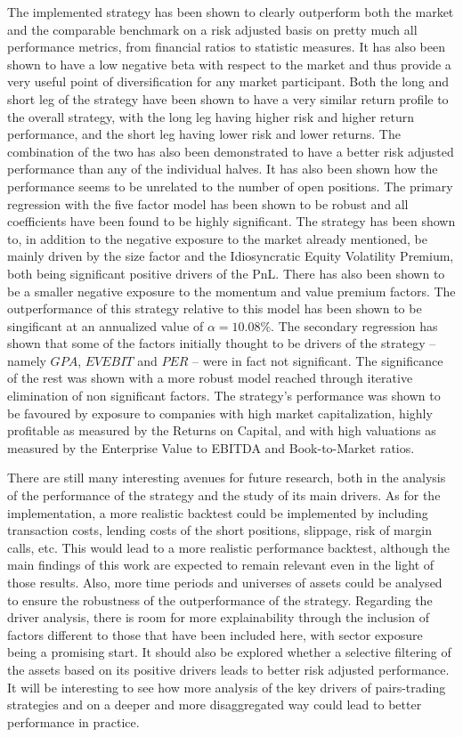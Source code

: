 The implemented strategy has been shown to clearly outperform both the market and the comparable benchmark on a risk adjusted basis on pretty much all performance metrics, from financial ratios to statistic measures. It has also been shown to have a low negative beta with respect to the market and thus provide a very useful point of diversification for any market participant. Both the long and short leg of the strategy have been shown to have a very similar return profile to the overall strategy, with the long leg having higher risk and higher return performance, and the short leg having lower risk and lower returns. The combination of the two has also been demonstrated to have a better risk adjusted performance than any of the individual halves. It has also been shown how the performance seems to be unrelated to the number of open positions. 
The primary regression with the five factor model has been shown to be robust and all coefficients have been found to be highly significant. The strategy has been shown to, in addition to the negative exposure to the market already mentioned, be mainly driven by the size factor and the Idiosyncratic Equity Volatility Premium, both being significant positive drivers of the PnL. There has also been shown to be a smaller negative exposure to the momentum and value premium factors. The outperformance of this strategy relative to this model has been shown to be singificant at an annualized value of $\alpha=10.08\%$. 
The secondary regression has shown that some of the factors initially thought to be drivers of the strategy -- namely $GPA$, $EVEBIT$ and $PER$ -- were in fact not significant. The significance of the rest was shown with a more robust model reached through iterative elimination of non significant factors. The strategy's performance was shown to be favoured by exposure to companies with high market capitalization, highly profitable as measured by the Returns on Capital, and with high valuations as measured by the Enterprise Value to EBITDA and Book-to-Market ratios. 

There are still many interesting avenues for future research, both in the analysis of the performance of the strategy and the study of its main drivers. 
As for the implementation, a more realistic backtest could be implemented by including transaction costs, lending costs of the short positions, slippage, risk of margin calls, etc. This would lead to a more realistic performance backtest, although the main findings of this work are expected to remain relevant even in the light of those results. Also, more time periods and universes of assets could be analysed to ensure the robustness of the outperformance of the strategy.
Regarding the driver analysis, there is room for more explainability through the inclusion of factors different to those that have been included here, with sector exposure being a promising start. It should also be explored whether a selective filtering of the assets based on its positive drivers leads to better risk adjusted performance. It will be interesting to see how more analysis of the key drivers of pairs-trading strategies and on a deeper and more disaggregated way could lead to better performance in practice.